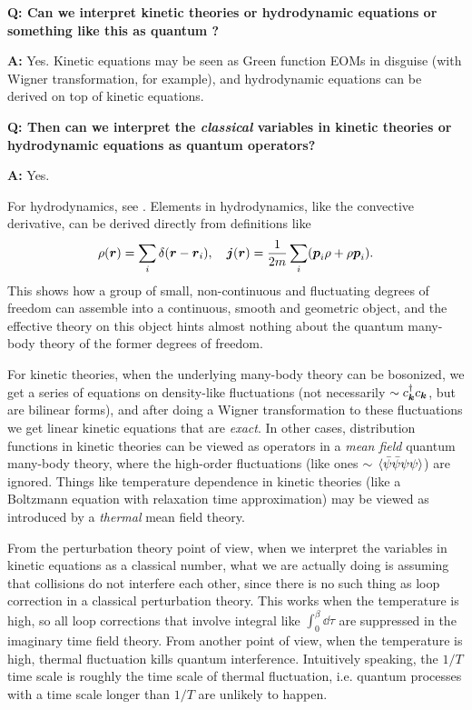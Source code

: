\documentclass[hyperref, a4paper]{article}
\newenvironment{qanda}{\setlength{\parindent}{0pt}}{\bigskip}
\newcommand{\Q}{\bigskip\bfseries Q: }
\newcommand{\A}{\par\textbf{A:} \normalfont}
\begin{document}
\begin{qanda}

\Q Can we interpret kinetic theories or hydrodynamic equations or something like this as quantum ?  
\A Yes. Kinetic equations may be seen as Green function EOMs in disguise (with Wigner transformation, 
for example), and hydrodynamic equations can be derived on top of kinetic equations.

\Q Then can we interpret the \emph{classical} variables in kinetic theories or hydrodynamic equations 
as quantum operators?
\A Yes. 

For hydrodynamics, see \cite{Penrose1954-zv}. Elements in hydrodynamics, like the convective derivative,
can be derived directly from definitions like 
\begin{equation}
    \rho(\vb*{r}) = \sum_i \delta(\vb*{r} - \vb*{r}_i), \quad 
    \vb*{j}(\vb*{r}) = \frac{1}{2m} \sum_i (\vb*{p}_i \rho + \rho \vb*{p}_i).
\end{equation} 
This shows how a group of small, non-continuous and fluctuating degrees of freedom can assemble into 
a continuous, smooth and geometric object, and the effective theory on this object hints almost nothing 
about the quantum many-body theory of the former degrees of freedom. 

For kinetic theories, when the underlying many-body theory can be bosonized, we get a series of equations  
on density-like fluctuations (not necessarily $\sim c_{\vb*{k}}^\dagger c_{\vb*{k}}$, but are bilinear forms), 
and after doing a Wigner transformation to these fluctuations we get linear kinetic equations that are \emph{exact}.
In other cases, distribution functions in kinetic theories can be viewed as operators in a \emph{mean field} 
quantum many-body theory, where the high-order fluctuations (like ones 
$\sim \expval*{\bar{\psi} \bar{\psi} \psi \psi}$) are ignored. Things like temperature dependence in kinetic 
theories (like a Boltzmann equation with relaxation time approximation) may be viewed as introduced by 
a \emph{thermal} mean field theory.

From the perturbation theory point of view, when we interpret the variables in kinetic equations as a 
classical number, what we are actually doing is assuming that collisions do not interfere each other, 
since there is no such thing as loop correction in a classical perturbation theory. 
This works when the temperature is high, so all loop corrections that involve integral like $\int_0^\beta \dd{\tau}$
are suppressed in the imaginary time field theory. 
From another point of view, when the temperature is high, thermal fluctuation kills quantum interference. 
Intuitively speaking, the $1/T$ time scale is roughly the time scale of thermal fluctuation, 
i.e. quantum processes with a time scale longer than $1/T$ are unlikely to happen.


\end{qanda}
\end{document}
